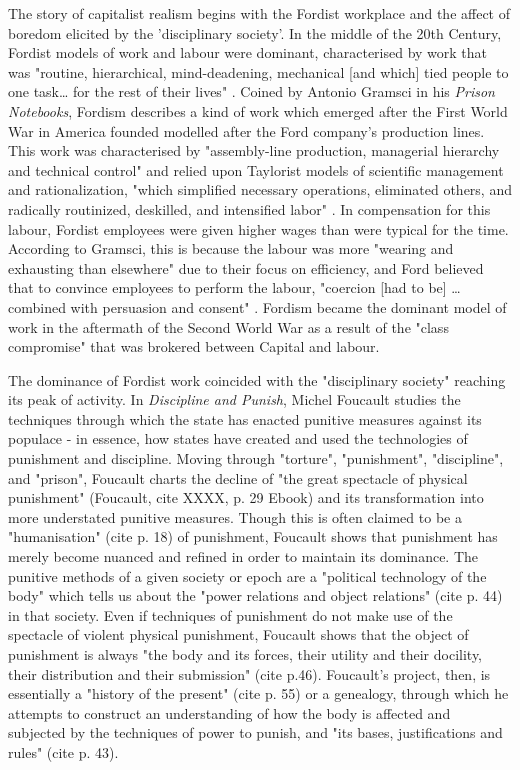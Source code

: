 The story of capitalist realism begins with the Fordist workplace and the affect of boredom elicited by the 'disciplinary society'. In the middle of the 20th Century, Fordist models of work and labour were dominant, characterised by work that was "routine, hierarchical, mind-deadening, mechanical [and which] tied people to one task\ldots{} for the rest of their lives" \citep[XXX]{HORGAN 2021}. Coined by Antonio Gramsci in his \emph{Prison Notebooks}, Fordism describes a kind of work which emerged after the First World War in America founded modelled after the Ford company's production lines. This work was characterised by "assembly-line production, managerial hierarchy and technical control" and relied upon Taylorist models of scientific management and rationalization, "which
simplified necessary operations, eliminated others, and radically routinized, deskilled, and intensified labor" \citep[34]{ANTONION AND BONANNO 2000}. In compensation for this labour, Fordist employees were given higher wages than were typical for the time. According to Gramsci, this is because the labour was more "wearing and exhausting than
elsewhere" \citep[311-312]{gramsci_selections_2007} due to their focus on efficiency, and Ford believed that to convince employees to perform the labour, "coercion [had to be] \ldots{} combined with persuasion and consent" \citep[310]{gramsci_selections_2007}. Fordism became the dominant model of work in the aftermath of the Second World War as a result of the "class compromise" \citep[X]{harvey_brief_2007} that was brokered between Capital and labour. 

The dominance of Fordist work coincided with the "disciplinary society" reaching its peak of activity. In \emph{Discipline and Punish}, Michel Foucault studies the techniques through which the state has enacted
punitive measures against its populace - in essence, how states have created and used the technologies of punishment and discipline. Moving through "torture", "punishment", "discipline", and "prison", Foucault charts the decline of
"the great spectacle of physical punishment" (Foucault, cite XXXX, p. 29 Ebook) and its transformation into more understated punitive measures. Though this is often claimed to be a "humanisation" (cite p. 18) of punishment, Foucault shows that punishment has merely become nuanced and refined in order to maintain its dominance. The punitive methods of a
given society or epoch are a "political technology of the body" which tells us about the "power relations and object relations" (cite p. 44) in that society. Even if techniques of punishment do not make use of the spectacle of violent physical punishment, Foucault shows that the object of punishment is always "the body and its forces, their utility
and their docility, their distribution and their submission" (cite p.46). Foucault's project, then, is essentially a "history of the present" (cite p. 55) or a genealogy, through which he attempts to construct an understanding of how the body is affected and subjected by the techniques of power to punish, and "its bases, justifications and rules" (cite p. 43).


